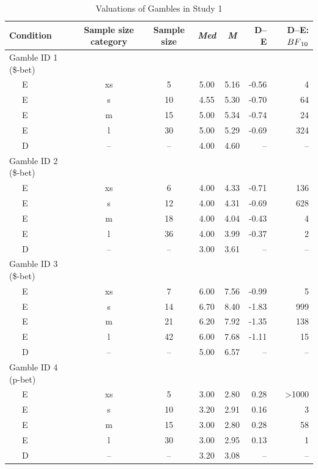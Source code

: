 \documentclass[
  a4paper, man, floatsintext]{apa6}
\begin{document}
\begin{table}[tbp]

\begin{center}
\begin{threeparttable}

\caption{\label{tab:means_study1}Valuations of Gambles in Study 1}

\begin{tabular}{lccccrr}
\toprule
Condition & Sample size category & Sample size & \textit{Med} & \textit{M} & D--E & D--E:$BF\textsubscript{10}$\\
\midrule
Gamble ID 1 (\$-bet) &  &  &  &  &  & \\
\ \ \ E & xs & 5 & 5.00 & 5.16 & -0.56 & 4\\
\ \ \ E & s & 10 & 4.55 & 5.30 & -0.70 & 64\\
\ \ \ E & m & 15 & 5.00 & 5.34 & -0.74 & 24\\
\ \ \ E & l & 30 & 5.00 & 5.29 & -0.69 & 324\\
\ \ \ D & -- & -- & 4.00 & 4.60 & -- & --\\
Gamble ID 2 (\$-bet) &  &  &  &  &  & \\
\ \ \ E & xs & 6 & 4.00 & 4.33 & -0.71 & 136\\
\ \ \ E & s & 12 & 4.00 & 4.31 & -0.69 & 628\\
\ \ \ E & m & 18 & 4.00 & 4.04 & -0.43 & 4\\
\ \ \ E & l & 36 & 4.00 & 3.99 & -0.37 & 2\\
\ \ \ D & -- & -- & 3.00 & 3.61 & -- & --\\
Gamble ID 3 (\$-bet) &  &  &  &  &  & \\
\ \ \ E & xs & 7 & 6.00 & 7.56 & -0.99 & 5\\
\ \ \ E & s & 14 & 6.70 & 8.40 & -1.83 & 999\\
\ \ \ E & m & 21 & 6.20 & 7.92 & -1.35 & 138\\
\ \ \ E & l & 42 & 6.00 & 7.68 & -1.11 & 15\\
\ \ \ D & -- & -- & 5.00 & 6.57 & -- & --\\
Gamble ID 4 (p-bet) &  &  &  &  &  & \\
\ \ \ E & xs & 5 & 3.00 & 2.80 & 0.28 & >1000\\
\ \ \ E & s & 10 & 3.20 & 2.91 & 0.16 & 3\\
\ \ \ E & m & 15 & 3.00 & 2.80 & 0.28 & 58\\
\ \ \ E & l & 30 & 3.00 & 2.95 & 0.13 & 1\\
\ \ \ D & -- & -- & 3.20 & 3.08 & -- & --\\

\end{tabular}
\end{threeparttable}
\end{center}
\end{table}
\end{document}
